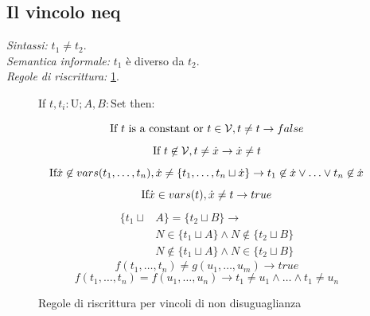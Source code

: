 \documentclass[12pt,a4paper,openright]{book} %
\begin{document}
\clearpage

\subsection{Il vincolo neq}

\textit{Sintassi:} $t_1 \neq t_2$.\\
\noindent\textit{Semantica informale:} $t_1$ è diverso da $t_2$.\\
\noindent\textit{Regole di riscrittura:} \ref{fig:neq_constraints}.

\begin{figure}[H]
	\label{fig:neq_constraints}
	
	\begin{tcolorbox}[colframe=black, colback=white, sharp corners]
		\setcounter{equation}{0}
		\renewcommand{\theequation}{$\neq$\textsubscript{\arabic{equation}}}
		
		If $t, t_i: \text{U}; A,B: \text{Set}$ then:
		
		\begin{equation}
		\text{If } t \text{ is a constant or } t \in \mathcal{V}, t \neq t \to false
		\end{equation}
		\begin{equation}
		\text{If } t \not\in \mathcal{V}, t \neq \dot{x} \to \dot{x} \neq t
		\end{equation}
		\begin{equation}
		\text{If} \dot{x} \not\in vars(t_1, \ldots, t_n), \dot{x} \neq \{ t_1, \ldots, t_n \sqcup \dot{x} \} \to t_1 \not\in \dot{x} \lor \ldots \lor t_n \not\in \dot{x}
		\end{equation}
		\begin{equation}
		\text{If} \dot{x} \in vars(t), \dot{x} \neq t \to true
		\end{equation}
		\begin{equation}
		\begin{split}
		\{ t_1 \sqcup & A \} = \{ t_2 \sqcup B \} \to \\
		& N \in \{ t_1 \sqcup A \} \land N \not\in \{ t_2 \sqcup B \} \\
		& N \not\in \{ t_1 \sqcup A \} \land N \in \{ t_2 \sqcup B \}
		\end{split}
		\end{equation}
		\begin{equation}
		f(t_1, \ldots, t_n) \neq g(u_1, \ldots, u_m) \to true
		\end{equation}
		\begin{equation}
		f(t_1, \ldots, t_n) = f(u_1, \ldots, u_n) \to t_1 \neq u_1 \land \ldots \land t_1 \neq u_n
		\end{equation}
		
	\end{tcolorbox}
	
	\caption{Regole di riscrittura per vincoli di non disuguaglianza}
\end{figure}
\end{document}
